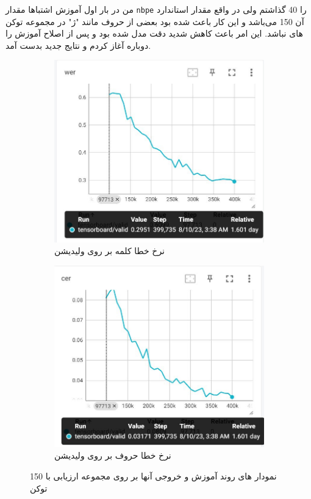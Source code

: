 من در بار اول آموزش اشتباها مقدار
\verb|nbpe|
را 40 گذاشتم ولی در واقع مقدار استاندارد آن 150 می‌باشد و این کار باعث شده بود بعضی از حروف مانند "ژ" در مجموعه توکن های نباشد. این امر باعث کاهش شدید دقت مدل  شده بود و پس از اصلاح آموزش را دوباره آغاز کردم و نتایج جدید بدست آمد.
\begin{figure}[H]
		\centering %
		\begin{subfigure}{0.5\textwidth}
			\includegraphics[width=1.1\linewidth, height=0.25\textheight]{Images/Chapter3/train1501.jpg}
			\caption{نرخ خطا  کلمه بر روی ولیدیشن}
			\label{f1}
		\end{subfigure}\hfil %
		\begin{subfigure}{0.5\textwidth}
			\includegraphics[width=1.1\linewidth, height=0.25\textheight]{Images/Chapter3/train1502.jpg}
			\caption{نرخ خطا حروف بر روی ولیدیشن}
			\label{f2}
		\end{subfigure}\hfil %
		\label{fig:train150}
            \caption{نمودار های روند آموزش و خروجی آنها بر روی مجموعه ارزیابی با 150 توکن}
\end{figure}
